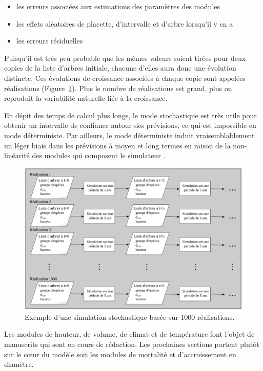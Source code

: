 \documentclass[a4paper,12pt]{article}
\begin{document}
\begin{itemize}
	\item les erreurs associées aux estimations des paramètres des modules
	\item les effets aléatoires de placette, d'intervalle et d'arbre lorsqu'il y en a
	\item les erreurs résiduelles
\end{itemize}

Puisqu'il est très peu probable que les m\^emes valeurs soient tirées pour deux copies de la liste d'arbres initiale, chacune d'elles aura donc une évolution distincte. Ces évolutions de croissance associées à chaque copie sont appelées réalisations (Figure~\ref{figureMCApproach}). Plus le nombre de réalisations est grand, plus on reproduit la variabilité naturelle liée à la croissance.

En dépit des temps de calcul plus longs, le mode stochastique est très utile pour obtenir un intervalle de confiance autour des prévisions, ce qui est impossible en mode déterministe. Par ailleurs, le mode déterministe induit vraisemblablement un léger biais dans les prévisions à moyen et long termes en raison de la non-linéarité des modules qui composent le simulateur \citep{fortin_stochastic_2012}.

\begin{figure}[h]
\begin{center}
\includegraphics[width=\textwidth]{./figures/mcApproach_fr}
\caption{Exemple d'une simulation stochastique basée sur 1000 réalisations.}
\label{figureMCApproach}
\end{center}
\end{figure}

Les modules de hauteur, de volume, de climat et de température font l'objet de manuscrits qui sont en cours de rédaction. Les prochaines sections portent plut\^ot sur le c\oe{}ur du modèle soit les modules de mortalité et d'accroissement en diamètre.
\end{document}
